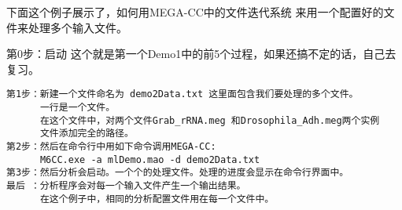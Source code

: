 \documentclass[11pt]{ctexart}
\begin{document}
下面这个例子展示了，如何用MEGA-CC中的文件迭代系统
来用一个配置好的文件来处理多个输入文件。

第0步：启动
这个就是第一个Demo1中的前5个过程，如果还搞不定的话，自己去复习。


\begin{verbatim}
第1步：新建一个文件命名为 demo2Data.txt 这里面包含我们要处理的多个文件。
      一行是一个文件。
      在这个文件中，对两个文件Grab_rRNA.meg 和Drosophila_Adh.meg两个实例
      文件添加完全的路径。
第2步：然后在命令行中用如下命令调用MEGA-CC:
      M6CC.exe -a mlDemo.mao -d demo2Data.txt
第3步：然后分析会启动。一个个的处理文件。处理的进度会显示在命令行界面中。
最后 ：分析程序会对每一个输入文件产生一个输出结果。
      在这个例子中，相同的分析配置文件用在每一个文件中。
\end{verbatim}
\end{document}
